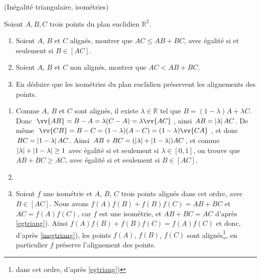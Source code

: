 \documentclass[a4paper,12pt,reqno]{amsart}
\newcommand*{\abs}[1]{\left\lvert{\ifx\hfuzz#1\hfuzz \,\cdot\,\else#1\fi}\right\rvert} %
\begin{document}
\sisujet{\vspace{17mm}}

\begin{exo} (Inégalité triangulaire, isométries)

  Soient $A,B,C$ trois points du plan euclidien $\mathbb{R}^{2}$.
  \begin{enumerate}
    \item Soient $A$, $B$ et $C$ alignés, montrer que $AC \leq AB+BC$, avec égalité si et seulement si $B \in [AC]$.
    \item Soient $A$, $B$ et $C$ non alignés, montrer que $AC < AB+BC$.
    \item En déduire que les isométries du plan euclidien préservent les alignements des points.
  \end{enumerate}
\end{exo}

\begin{solution}
  \begin{enumerate}
    \item\label{egtriang} Comme $A$, $B$ et $C$ sont alignés, il existe $\lambda \in \mathbb{R}$ tel que $B=(1- \lambda)A + \lambda C$. Donc $\vv{AB} = B - A = \lambda (C-A) = \lambda \vv{AC}$, ainsi $AB = \abs{\lambda} AC$. De même $\vv{CB} = B - C = (1-\lambda)(A-C) = (1-\lambda)\vv{CA}$, et donc $BC=\abs{1- \lambda}AC$. Ainsi $AB+BC = (\abs{\lambda}+\abs{1-\lambda})AC$, et comme $\abs{\lambda}+\abs{1-\lambda} \geq 1$ avec égalité si et seulement si $\lambda \in [0,1]$, on trouve que $AB+BC \geq AC$, avec égalité si et seulement si $B \in [AC]$.
    \item\label{inegtriang}\vspace{-2mm}
    \vspace{3mm}
    \item Soient $f$ une isométrie et $A$, $B$, $C$ trois points alignés dans cet ordre, avec $B \in [AC]$. Nous avons $f(A)f(B) + f(B)f(C) = AB + BC$ et $AC = f(A)f(C)$, car $f$ est une isométrie, et $AB + BC = AC$ d'après \ref{egtriang}). Ainsi $f(A)f(B) + f(B)f(C) = f(A)f(C)$ et donc, d'après \ref{inegtriang}), les points $f(A)$, $f(B)$, $f(C)$ sont alignés\footnote{dans cet ordre, d'après \ref{egtriang})}, en particulier $f$ préserve l'alignement des points.
  \end{enumerate}
\end{solution}
\end{document}

